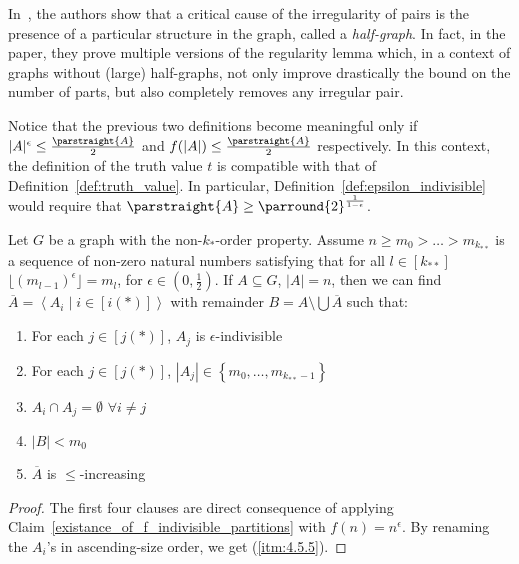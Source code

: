 
In~\cite{regularity_lemmas_for_stable_graphs}, the authors show that a critical
cause of the irregularity of pairs is the presence of a particular structure in the graph, called a \emph{half-graph}.
In fact, in the paper, they prove multiple versions of the regularity lemma which, in a context of graphs without (large)
half-graphs, not only improve drastically the bound on the number of parts, but also completely removes any irregular pair.


    \remark
        Notice that the previous two definitions become meaningful only if $|A|^{\epsilon} \leq \frac{\parstraight{A}}{2}$ and
        $f(|A|) \leq \frac{\parstraight{A}}{2}$ respectively.
        In this context, the definition of the truth value $t$ is compatible with that of Definition~\ref{def:truth_value}.
        In particular, Definition~\ref{def:epsilon_indivisible} would require that $\parstraight{A} \geq \parround{2}^{\frac{1}{1-\epsilon}}$.


    \lemma[Claim 4.5]\label{existance_of_ordered_epsilon_indivisible_partitions}
    Let $G$ be a graph with the non-$k_{*}$-order property.
    Assume $n \geq m_0 > \dots > m_{k_{**}}$ is a sequence of non-zero natural numbers satisfying that for all $l \in [k_{**}]$
        $\lfloor (m_{l-1})^\epsilon \rfloor = m_l$, for $\epsilon \in (0, \frac{1}{2})$.
    If $A \subseteq G$, $|A| = n$, then we can find $\overline{A} = \left< A_i \mid i \in [i(*)] \right>$ with remainder
        $B = A \setminus \bigcup \overline{A}$ such that:
    \begin{enumerate}  %
        \item \label{itm:4.5.1} For each $j \in [j(*)]$, $A_j$ is $\epsilon$-indivisible
        \item \label{itm:4.5.2} For each $j \in [j(*)]$, $|A_j| \in \left\{ m_0, \dots, m_{k_{**}-1} \right\}$
        \item \label{itm:4.5.3} $A_i \cap A_j = \emptyset$ $\forall i \neq j$
        \item \label{itm:4.5.4} $|B| < m_0$
        \item \label{itm:4.5.5} $\overline{A}$ is $\leq$-increasing
    \end{enumerate}
        \begin{proof}
            The first four clauses are direct consequence of applying Claim~\ref{existance_of_f_indivisible_partitions}
                with $f(n) = n^\epsilon$.
            By renaming the $A_i$'s in ascending-size order, we get (\ref{itm:4.5.5}).
        \end{proof}

